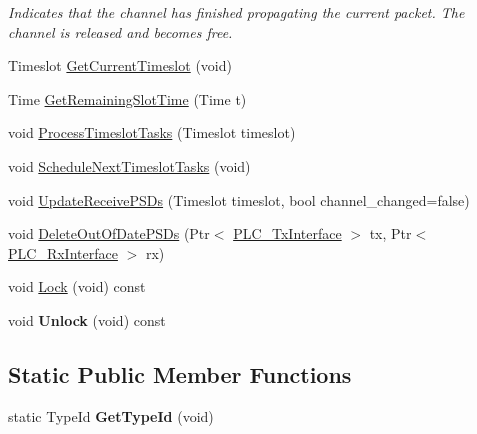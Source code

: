 \begin{DoxyCompactItemize}
\begin{DoxyCompactList}\small\item\em \-Indicates that the channel has finished propagating the current packet. \-The channel is released and becomes free. \end{DoxyCompactList}\item 
\-Timeslot \hyperlink{classns3_1_1PLC__Channel_a98aa64e61af6c58a7cfbcb40570237b1}{\-Get\-Current\-Timeslot} (void)
\item 
\-Time \hyperlink{classns3_1_1PLC__Channel_acf2ae112a813063d27798f9ac196fa02}{\-Get\-Remaining\-Slot\-Time} (\-Time t)
\item 
void \hyperlink{classns3_1_1PLC__Channel_ad19b881e0302a2a3e0dda571ecf83bf7}{\-Process\-Timeslot\-Tasks} (\-Timeslot timeslot)
\item 
void \hyperlink{classns3_1_1PLC__Channel_a16a04f6f67a846e5268bd88585ef41c8}{\-Schedule\-Next\-Timeslot\-Tasks} (void)
\item 
void \hyperlink{classns3_1_1PLC__Channel_abd286d90c5e534bd30284dec68d9a5b0}{\-Update\-Receive\-P\-S\-Ds} (\-Timeslot timeslot, bool channel\-\_\-changed=false)
\item 
void \hyperlink{classns3_1_1PLC__Channel_adcb2c90b76ee9555e22ac717df870a61}{\-Delete\-Out\-Of\-Date\-P\-S\-Ds} (\-Ptr$<$ \hyperlink{classns3_1_1PLC__TxInterface}{\-P\-L\-C\-\_\-\-Tx\-Interface} $>$ tx, \-Ptr$<$ \hyperlink{classns3_1_1PLC__RxInterface}{\-P\-L\-C\-\_\-\-Rx\-Interface} $>$ rx)
\item 
void \hyperlink{classns3_1_1PLC__Channel_a61b0040978135b9c6368bf4cd1bb7561}{\-Lock} (void) const 
\item 
\hypertarget{classns3_1_1PLC__Channel_a19fb8d37e61ea9b98cd3b5748502a1e9}{void {\bfseries \-Unlock} (void) const }\label{classns3_1_1PLC__Channel_a19fb8d37e61ea9b98cd3b5748502a1e9}

\end{DoxyCompactItemize}
\subsection*{\-Static \-Public \-Member \-Functions}
\begin{DoxyCompactItemize}
\item 
\hypertarget{classns3_1_1PLC__Channel_a5eda32b8aa44efc775175bbd2ea0d045}{static \-Type\-Id {\bfseries \-Get\-Type\-Id} (void)}\label{classns3_1_1PLC__Channel_a5eda32b8aa44efc775175bbd2ea0d045}

\end{DoxyCompactItemize}
